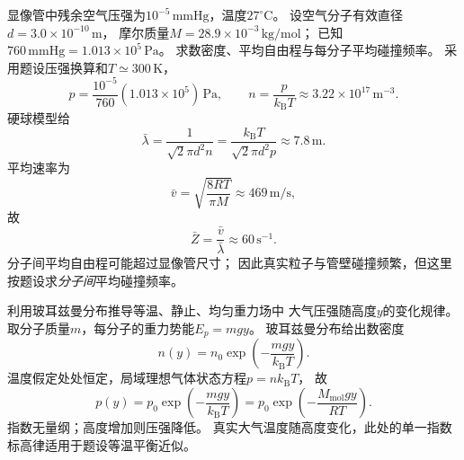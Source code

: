 \problemtext 显像管中残余空气压强为$10^{-5}\,\mathrm{mmHg}$，温度$27^\circ\mathrm C$。
设空气分子有效直径$d=3.0\times10^{-10}\,\mathrm m$，
摩尔质量$M=28.9\times10^{-3}\,\mathrm{kg/mol}$；
已知$760\,\mathrm{mmHg}=1.013\times10^5\,\mathrm{Pa}$。
求数密度、平均自由程与每分子平均碰撞频率。
\workings
采用题设压强换算和$T\simeq300\,\mathrm K$，
\[
p=\frac{10^{-5}}{760}(1.013\times10^5)\,\mathrm{Pa},
\qquad
\boxed{n=\frac p{k_{\mathrm B}T}\approx3.22\times10^{17}\,\mathrm{m^{-3}}}.
\]
硬球模型给
\[
\boxed{\bar\lambda
=\frac1{\sqrt2\pi d^2 n}
=\frac{k_{\mathrm B}T}{\sqrt2\pi d^2p}
\approx7.8\,\mathrm m}.
\]
平均速率为
\[
\bar v=\sqrt{\frac{8RT}{\pi M}}\approx469\,\mathrm{m/s},
\]
故
\[
\boxed{\bar Z=\frac{\bar v}{\bar\lambda}
\approx60\,\mathrm{s^{-1}}}.
\]
\crosscheck 分子间平均自由程可能超过显像管尺寸；
因此真实粒子与管壁碰撞频繁，但这里按题设求\emph{分子间}平均碰撞频率。

\problemtext 利用玻耳兹曼分布推导等温、静止、均匀重力场中
大气压强随高度$y$的变化规律。
\workings
取分子质量$m$，每分子的重力势能$E_p=mgy$。
玻耳兹曼分布给出数密度
\[
n(y)=n_0\exp\left(-\frac{mgy}{k_{\mathrm B}T}\right).
\]
温度假定处处恒定，局域理想气体状态方程$p=nk_{\mathrm B}T$，
故
\[
\boxed{p(y)=p_0\exp\left(-\frac{mgy}{k_{\mathrm B}T}\right)}
=\boxed{p_0\exp\left(-\frac{M_{\mathrm{mol}}gy}{RT}\right)}.
\]
\crosscheck 指数无量纲；高度增加则压强降低。
真实大气温度随高度变化，此处的单一指数标高律适用于题设等温平衡近似。
